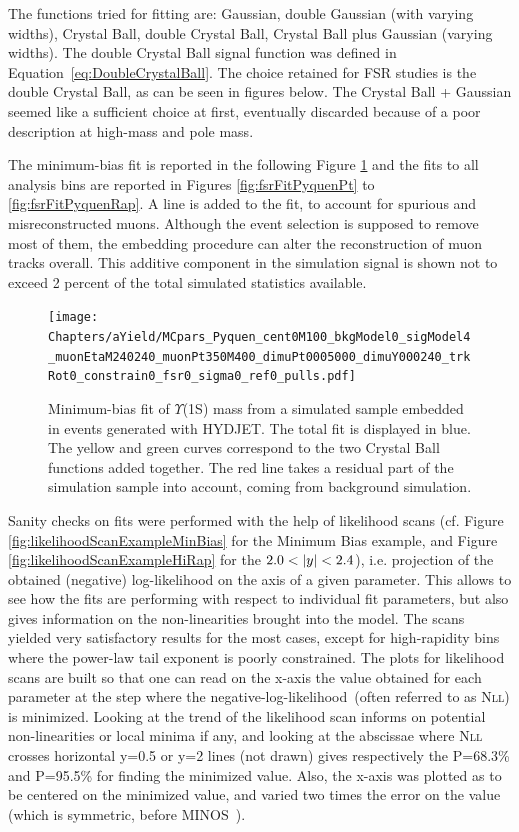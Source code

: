 The functions tried for fitting are: Gaussian, double Gaussian (with
varying widths), Crystal Ball, double Crystal Ball, Crystal Ball plus
Gaussian (varying widths). The double Crystal Ball signal function
was defined in Equation~\ref{eq:DoubleCrystalBall}. The choice
retained for FSR studies is the double Crystal Ball, as can be seen in
figures below. The Crystal Ball + Gaussian seemed like a sufficient
choice at first, eventually discarded because of a poor description
at high-mass and pole mass. 

The minimum-bias fit is reported in the following Figure
\ref{fig:fsrMBFitPyquen} and the fits to all analysis bins are
reported in Figures \ref{fig:fsrFitPyquenPt} to
\ref{fig:fsrFitPyquenRap}. A line is added
to the fit, to account for spurious and misreconstructed
muons. Although the event selection is supposed to remove most of
them, the embedding procedure can alter the reconstruction of muon tracks
overall. This additive component in the simulation
signal is shown not to exceed 2 percent of the total simulated
statistics available. 


\begin{figure}[h]
\begin{center}
\texttt{[image: Chapters/aYield/MCpars\_Pyquen\_cent0M100\_bkgModel0\_sigModel4\_muonEtaM240240\_muonPt350M400\_dimuPt0005000\_dimuY000240\_trkRot0\_constrain0\_fsr0\_sigma0\_ref0\_pulls.pdf]}  
\caption{Minimum-bias fit of $\Upsilon$(1S) mass from a simulated
  sample embedded in events generated with HYDJET. The total fit is
  displayed in blue. The yellow and green curves correspond to the two
Crystal Ball functions added together. The red line takes a residual
part of the simulation sample into account, coming
from background simulation.}
\label{fig:fsrMBFitPyquen}
\end{center}
\end{figure}


Sanity checks on fits were performed with the help of likelihood
scans (cf. Figure \ref{fig:likelihoodScanExampleMinBias} for the Minimum Bias
example, and Figure \ref{fig:likelihoodScanExampleHiRap} for the
$2.0 < \vert y\vert < 2.4$), i.e. projection of the obtained (negative) log-likelihood on
the axis of a given parameter. This allows to see how the fits are
performing with respect to individual fit parameters, but also gives information on the non-linearities
brought into the model. The scans yielded very satisfactory
results for the most cases, except for high-rapidity bins where the
power-law tail exponent is poorly constrained.
The plots for likelihood scans are built so that one can read on the
x-axis the value obtained for each parameter at the step where the
negative-log-likelihood~(often referred to as \textsc{Nll}) is
minimized. Looking at the trend of the likelihood scan
informs on potential non-linearities or local minima if any, and
looking at the abscissae where \textsc{Nll} crosses horizontal y=0.5
or y=2 lines (not drawn) gives respectively the P=68.3\% and
P=95.5\% for finding the minimized value. Also, the x-axis was plotted
as to be centered on the minimized value, and varied two times the error on
the value (which is symmetric, before MINOS~\cite{minos}).

